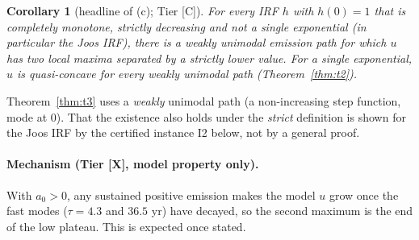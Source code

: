 \documentclass[10pt]{article}
\newcommand{\tier}[1]{\textsf{[#1]}}
\newcommand{\tC}{\tier{C}}
\newcommand{\tX}{\tier{X}}
\theoremstyle{plain}
\newtheorem{cor}[thm]{Corollary}
\begin{document}
\begin{cor}[headline of (c); Tier \tC{}]\label{cor:c}
For every IRF $h$ with $h(0)=1$ that is completely monotone, strictly decreasing and not a single exponential (in particular the Joos IRF), there is a weakly unimodal emission path for which $u$ has two local maxima separated by a strictly lower value. For a single exponential, $u$ is quasi-concave for every weakly unimodal path (Theorem~\ref{thm:t2}).
\end{cor}
Theorem~\ref{thm:t3} uses a \emph{weakly} unimodal path (a non-increasing step function, mode at $0$). That the existence also holds under the \emph{strict} definition is shown for the Joos IRF by the certified instance I2 below, not by a general proof.
\paragraph{Mechanism (Tier \tX{}, model property only).} With $a_0>0$, any sustained positive emission makes the model $u$ grow once the fast modes ($\tau=4.3$ and $36.5$ yr) have decayed, so the second maximum is the end of the low plateau. This is expected once stated.
\end{document}
